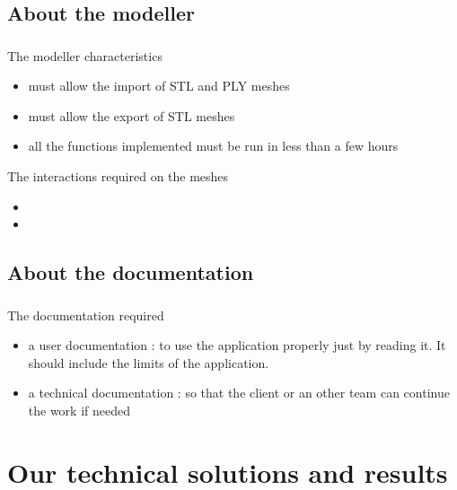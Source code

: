 \documentclass{beamer}
\begin{document}
\subsection{About the modeller}
\begin{frame}
	\frametitle{}
	 \begin{block}{The modeller characteristics}
		\begin{itemize}
			\item must allow the import of STL and PLY meshes
			\item must allow the export of STL meshes
			\item all the functions implemented must be run in less than a few hours
		\end{itemize}
    \end{block}
    
    \begin{block}{The interactions required on the meshes}
		\begin{itemize}
			\item 
			\item 
		\end{itemize}
    \end{block}

\end{frame}

\subsection{About the documentation}
\begin{frame}
	\frametitle{}
	 \begin{block}{The documentation required}
		\begin{itemize}
			\item a user documentation : to use the application properly just by reading it. It should include the limits of the application.
			\item a technical documentation : so that the client or an other team can continue the work if needed
		\end{itemize}
    \end{block}    

\end{frame}

\section{Our technical solutions and results}
\end{document}
